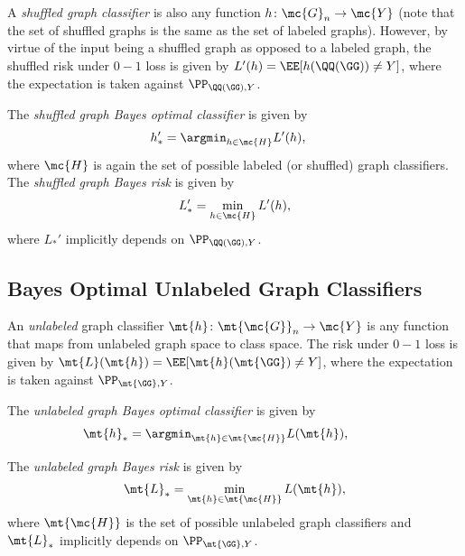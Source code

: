 A \emph{shuffled graph classifier} is also any function $h\colon \mc{G}_n \to \mc{Y}$ (note that the set of shuffled graphs is the same as the set of labeled graphs). However, by virtue of the input being a shuffled graph as opposed to a labeled graph, the shuffled risk under $0-1$ loss is given by $L'(h)=\EE[h(\QQ(\GG)) \neq Y]$, where the expectation is taken against $\PP_{\QQ(\GG),Y}$. %

The \emph{shuffled graph Bayes optimal classifier} is given by
\begin{align}
	h_*' &= \argmin_{h \in \mc{H}} L'(h), %
\end{align}
where $\mc{H}$ is again the set of possible labeled (or shuffled) graph classifiers. The \emph{shuffled graph Bayes risk} is given by
\begin{align}
	L_*' =\min_{h \in \mc{H}} L'(h),
\end{align}
where  $L_*'$ implicitly depends on $\PP_{\QQ(\GG),Y}$.  %

\subsection{Bayes Optimal Unlabeled Graph Classifiers} %


An \emph{unlabeled} graph classifier $\mt{h}\colon \mt{\mc{G}}_n \to \mc{Y}$ is any function that maps from unlabeled graph space to class space. The risk under $0-1$ loss is given by $\mt{L}(\mt{h})=\EE[\mt{h}(\mt{\GG})\neq Y]$, where the expectation is taken against $\PP_{\mt{\GG},Y}$. 

The \emph{unlabeled graph Bayes optimal classifier} is given by %
\begin{align}
	\mt{h}_* &= \argmin_{\mt{h} \in \mt{\mc{H}}} L(\mt{h}), \qquad %
\end{align}



The \emph{unlabeled graph Bayes risk} is given by %
\begin{align}
	\mt{L}_* =\min_{\mt{h} \in \mt{\mc{H}}} L(\mt{h}),
\end{align}
where $\mt{\mc{H}}$ is the set of possible unlabeled graph classifiers
and $\mt{L}_*$ implicitly depends on $\PP_{\mt{\GG},Y}$.  

